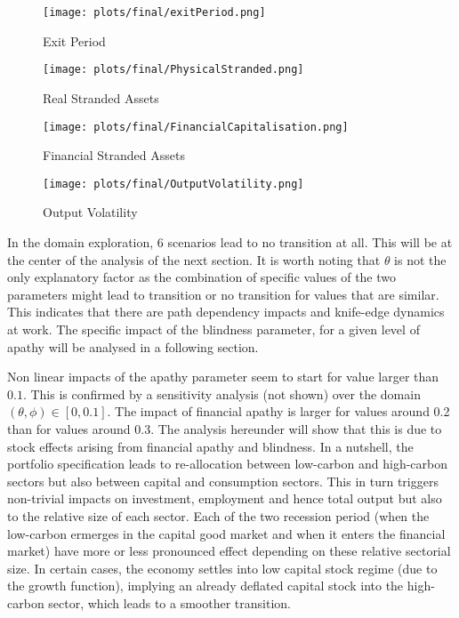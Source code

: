 \documentclass[]{article}
\begin{document}
\begin{figure}[htbp]
\centering
\texttt{[image: plots/final/exitPeriod.png]}
\caption{Exit Period}
\end{figure}

\begin{figure}[htbp]
\centering
\texttt{[image: plots/final/PhysicalStranded.png]}
\caption{Real Stranded Assets}
\end{figure}

\begin{figure}[htbp]
\centering
\texttt{[image: plots/final/FinancialCapitalisation.png]}
\caption{Financial Stranded Assets}
\end{figure}

\begin{figure}[htbp]
\centering
\texttt{[image: plots/final/OutputVolatility.png]}
\caption{Output Volatility}
\end{figure}

In the domain exploration, 6 scenarios lead to no transition at all.
This will be at the center of the analysis of the next section. It is
worth noting that \(\theta\) is not the only explanatory factor as the
combination of specific values of the two parameters might lead to
transition or no transition for values that are similar. This indicates
that there are path dependency impacts and knife-edge dynamics at work.
The specific impact of the blindness parameter, for a given level of
apathy will be analysed in a following section.

Non linear impacts of the apathy parameter seem to start for value
larger than \(0.1\). This is confirmed by a sensitivity analysis (not
shown) over the domain \((\theta,\phi)\in [0,0.1]\). The impact of
financial apathy is larger for values around 0.2 than for values around
0.3. The analysis hereunder will show that this is due to stock effects
arising from financial apathy and blindness. In a nutshell, the
portfolio specification leads to re-allocation between low-carbon and
high-carbon sectors but also between capital and consumption sectors.
This in turn triggers non-trivial impacts on investment, employment and
hence total output but also to the relative size of each sector. Each of
the two recession period (when the low-carbon ermerges in the capital
good market and when it enters the financial market) have more or less
pronounced effect depending on these relative sectorial size. In certain
cases, the economy settles into low capital stock regime (due to the
growth function), implying an already deflated capital stock into the
high-carbon sector, which leads to a smoother transition.
\end{document}
